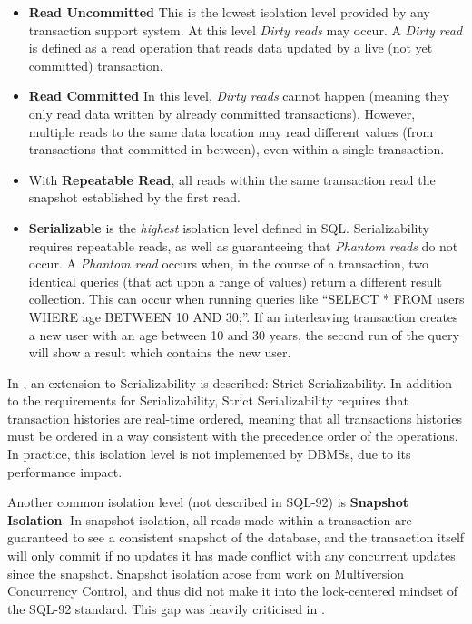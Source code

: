 \documentclass{llncs}
\begin{document}
\begin{itemize}
\item {\bf Read Uncommitted} This is the lowest isolation level
  provided by any transaction support system. At this level {\it Dirty
    reads} may occur. A {\it Dirty read} is defined as a read
  operation that reads data updated by a live (not yet committed)
  transaction.
\item {\bf Read Committed} In this level, {\it Dirty reads} cannot
  happen (meaning they only read data written by already committed
  transactions). However, multiple reads to the same data location may
  read different values (from transactions that committed in between),
  even within a single transaction.
\item With {\bf Repeatable Read}, all reads within the same
  transaction read the snapshot established by the first read.
\item {\bf Serializable} is the {\it highest} isolation level defined
  in SQL. Serializability requires repeatable reads, as well as
  guaranteeing that {\it Phantom reads} do not occur. A {\it Phantom
    read} occurs when, in the course of a transaction, two identical
  queries (that act upon a range of values) return a different result
  collection. This can occur when running queries like ``SELECT * FROM
  users WHERE age BETWEEN 10 AND 30;''. If an interleaving transaction
  creates a new user with an age between 10 and 30 years, the second
  run of the query will show a result which contains the new user.
\end{itemize}

In \cite{papadimitriou1979serializability}, an extension to
Serializability is described: Strict Serializability. In addition to
the requirements for Serializability, Strict Serializability requires
that transaction histories are real-time ordered, meaning that all
transactions histories must be ordered in a way consistent with the
precedence order of the operations. In practice, this isolation level
is not implemented by DBMSs, due to its performance impact.

Another common isolation level (not described in SQL-92) is {\bf
  Snapshot Isolation}. In snapshot isolation, all reads made within a
transaction are guaranteed to see a consistent snapshot of the
database, and the transaction itself will only commit if no updates it
has made conflict with any concurrent updates since the
snapshot. Snapshot isolation arose from work on Multiversion
Concurrency Control, and thus did not make it into the lock-centered
mindset of the SQL-92 standard. This gap was heavily criticised in
\cite{berenson1995critique}.
\end{document}
